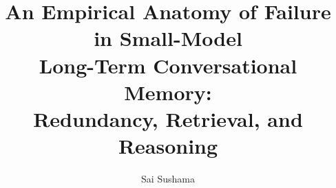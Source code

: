 \documentclass[11pt]{article}
\title{\bf An Empirical Anatomy of Failure in Small-Model\\ Long-Term Conversational Memory:\\ Redundancy, Retrieval, and Reasoning}
\author{Sai Sushama}
\affil{\normalsize (author affiliation)}
\date{}
\begin{document}
\maketitle

\begin{abstract}

\end{abstract}















\end{document}
